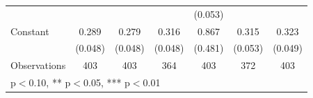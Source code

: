 \begin{table}[htbp]
\begin{tabular}{l*{6}{c}}
{                    &                     &                     &                     &     (0.053)         &                     &                     \\
\addlinespace
Constant            &       0.289\sym{***}&       0.279\sym{***}&       0.316\sym{***}&       0.867\sym{*}  &       0.315\sym{***}&       0.323\sym{***}\\
                    &     (0.048)         &     (0.048)         &     (0.048)         &     (0.481)         &     (0.053)         &     (0.049)         \\
\midrule
Observations        &         403         &         403         &         364         &         403         &         372         &         403         \\
\bottomrule
\multicolumn{7}{l}{\footnotesize * p$<$0.10, ** p$<$0.05, *** p$<$0.01}\\
\end{tabular}
\end{table}
